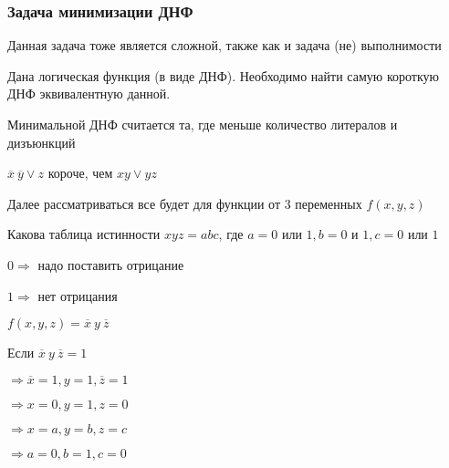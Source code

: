 \documentclass[russian]{lecture-notes}
\begin{document}
\begin{sloppypar}


\subsubsection{Задача минимизации ДНФ}

	Данная задача тоже является сложной, также как и задача (не) выполнимости
	
	Дана логическая функция (в виде ДНФ). Необходимо найти самую короткую ДНФ эквивалентную данной.
	
	Минимальной ДНФ считается та, где меньше количество литералов и дизъюнкций
	
\begin{example}
	$\overline{x} \: \overline{y} \lor z$ короче, чем $xy \lor yz$
\end{example}

\begin{remark}
	Далее рассматриваться все будет для функции от 3 переменных $f(x, y, z)$
\end{remark}

\begin{remark}
	Какова таблица истинности $xyz = abc$, где $a = 0$ или $1, b = 0$ и $1, c = 0$ или $1$
	
	$0 \Rightarrow$ надо поставить отрицание
	
	$1 \Rightarrow$ нет отрицания
\end{remark}

\begin{example}
	$f(x, y, z) = \overline{x} \: y \: \overline{z}$
	
	Если $\overline{x} \: y \: \overline{z} = 1$
	
	$\Rightarrow \overline{x} = 1,  y = 1, \overline{z} = 1$ 
	
	$\Rightarrow x = 0,  y = 1, z = 0$

	$\Rightarrow x = a, y = b, z = c$

	$\Rightarrow a = 0, b = 1, c = 0$


\end{example}
\end{sloppypar}
\end{document}
